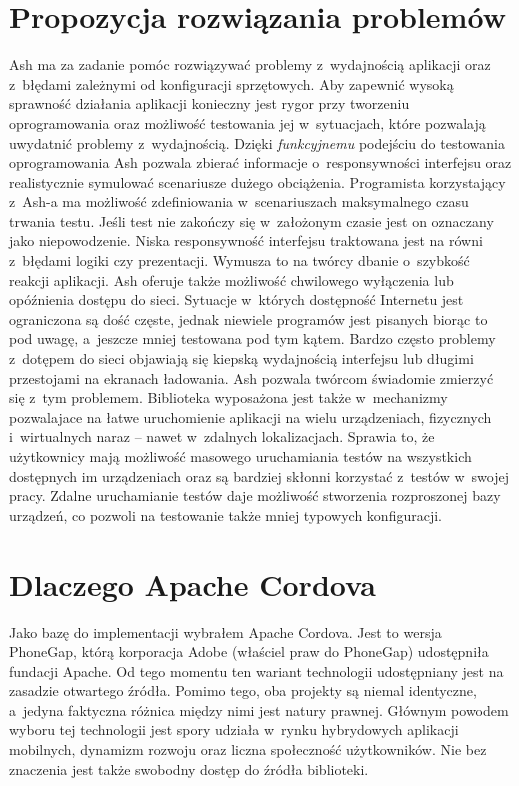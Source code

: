 \documentclass[brudnopis]{xmgr}
\begin{document}
\section{Propozycja rozwiązania problemów}
Ash ma za zadanie pomóc rozwiązywać problemy z~wydajnością aplikacji oraz z~błędami zależnymi od konfiguracji sprzętowych. Aby
zapewnić wysoką sprawność działania aplikacji konieczny jest rygor przy tworzeniu
oprogramowania oraz możliwość testowania jej w~sytuacjach, które pozwalają
uwydatnić problemy z~wydajnością. Dzięki \textit{funkcyjnemu} podejściu do testowania
oprogramowania Ash pozwala zbierać informacje o~responsywności interfejsu
oraz realistycznie symulować scenariusze dużego obciążenia. Programista
korzystający z~Ash-a ma możliwość zdefiniowania w~scenariuszach maksymalnego
czasu trwania testu. Jeśli test nie zakończy się w~założonym czasie jest on oznaczany jako niepowodzenie. Niska responsywność interfejsu traktowana jest na równi z~błędami
logiki czy prezentacji. Wymusza to na twórcy dbanie o~szybkość reakcji aplikacji.
Ash oferuje także możliwość chwilowego wyłączenia lub opóźnienia dostępu do
sieci. Sytuacje w~których dostępność Internetu jest ograniczona są dość częste,
jednak niewiele programów jest pisanych biorąc to pod uwagę, a~jeszcze mniej 
testowana pod tym kątem. Bardzo często problemy z~dotępem do sieci objawiają się kiepską
wydajnością interfejsu lub długimi przestojami na ekranach ładowania. Ash pozwala
twórcom świadomie zmierzyć się z~tym problemem. Biblioteka wyposażona jest także w~mechanizmy pozwalajace na łatwe uruchomienie aplikacji na wielu urządzeniach, fizycznych i~wirtualnych naraz -- nawet w~zdalnych lokalizacjach. Sprawia to, że
użytkownicy mają możliwość masowego uruchamiania testów na wszystkich
dostępnych im urządzeniach oraz są bardziej skłonni korzystać z~testów w~swojej pracy. Zdalne uruchamianie testów daje możliwość stworzenia
rozproszonej bazy urządzeń, co pozwoli na testowanie także mniej typowych
konfiguracji.

\section{Dlaczego Apache Cordova}
Jako bazę do implementacji wybrałem Apache Cordova. Jest to
wersja PhoneGap, którą korporacja Adobe (właściel praw do PhoneGap) udostępniła
fundacji Apache. Od tego momentu ten wariant technologii udostępniany jest
na zasadzie otwartego źródła. Pomimo tego, oba projekty są niemal identyczne, a~jedyna faktyczna różnica między nimi jest natury prawnej. Głównym powodem
wyboru tej technologii jest spory udziała w~rynku hybrydowych aplikacji mobilnych,
dynamizm rozwoju oraz liczna społeczność użytkowników. Nie bez znaczenia jest także swobodny dostęp do źródła biblioteki.
\end{document}
